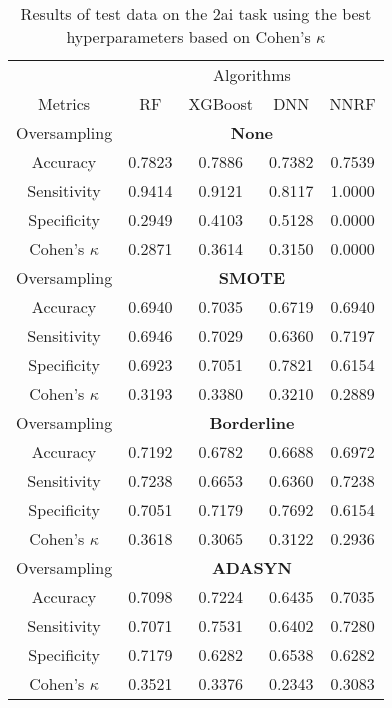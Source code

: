 \begin{table}[!htb]
\centering
\caption{Results of test data on the 2ai task using the best hyperparameters based on Cohen's $\kappa$}
\label{tab:2ai_test_results}
\begin{tabular}{c | c c c c}
\hline
 & \multicolumn{4}{c}{Algorithms}\\ 
Metrics &RF & XGBoost & DNN & NNRF\\ 
\hline
Oversampling &\multicolumn{4}{|c}{\textbf{None}}\\ 
\hline
Accuracy & 0.7823 & 0.7886 & 0.7382 & 0.7539\\ 
Sensitivity & 0.9414 & 0.9121 & 0.8117 & 1.0000\\ 
Specificity & 0.2949 & 0.4103 & 0.5128 & 0.0000\\ 
Cohen's $\kappa$ & 0.2871 & 0.3614 & 0.3150 & 0.0000\\ 
\hline
Oversampling &\multicolumn{4}{|c}{\textbf{SMOTE}}\\ 
\hline
Accuracy & 0.6940 & 0.7035 & 0.6719 & 0.6940\\ 
Sensitivity & 0.6946 & 0.7029 & 0.6360 & 0.7197\\ 
Specificity & 0.6923 & 0.7051 & 0.7821 & 0.6154\\ 
Cohen's $\kappa$ & 0.3193 & 0.3380 & 0.3210 & 0.2889\\ 
\hline
Oversampling &\multicolumn{4}{|c}{\textbf{Borderline}}\\ 
\hline
Accuracy & 0.7192 & 0.6782 & 0.6688 & 0.6972\\ 
Sensitivity & 0.7238 & 0.6653 & 0.6360 & 0.7238\\ 
Specificity & 0.7051 & 0.7179 & 0.7692 & 0.6154\\ 
Cohen's $\kappa$ & 0.3618 & 0.3065 & 0.3122 & 0.2936\\ 
\hline
Oversampling &\multicolumn{4}{|c}{\textbf{ADASYN}}\\ 
\hline
Accuracy & 0.7098 & 0.7224 & 0.6435 & 0.7035\\ 
Sensitivity & 0.7071 & 0.7531 & 0.6402 & 0.7280\\ 
Specificity & 0.7179 & 0.6282 & 0.6538 & 0.6282\\ 
Cohen's $\kappa$ & 0.3521 & 0.3376 & 0.2343 & 0.3083\\ 
\hline
\end{tabular}
\end{table}

